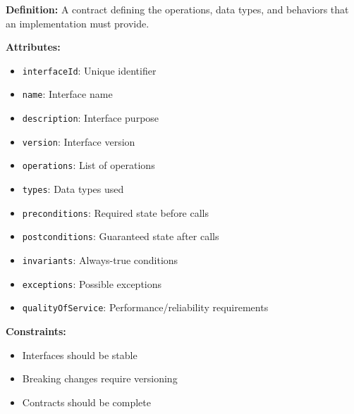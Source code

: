 \documentclass[11pt,letterpaper]{article}
\begin{document}
\begin{definitionbox}
\textbf{Definition:} A contract defining the operations, data types, and behaviors that an implementation must provide.

\textbf{Attributes:}
\begin{itemize}[nosep]
    \item \texttt{interfaceId}: Unique identifier
    \item \texttt{name}: Interface name
    \item \texttt{description}: Interface purpose
    \item \texttt{version}: Interface version
    \item \texttt{operations}: List of operations
    \item \texttt{types}: Data types used
    \item \texttt{preconditions}: Required state before calls
    \item \texttt{postconditions}: Guaranteed state after calls
    \item \texttt{invariants}: Always-true conditions
    \item \texttt{exceptions}: Possible exceptions
    \item \texttt{qualityOfService}: Performance/reliability requirements
\end{itemize}

\textbf{Constraints:}
\begin{itemize}[nosep]
    \item Interfaces should be stable
    \item Breaking changes require versioning
    \item Contracts should be complete
\end{itemize}
\end{definitionbox}
\end{document}

